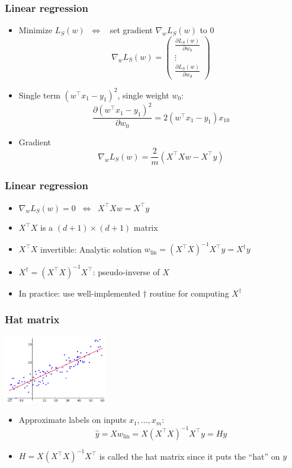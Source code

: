 \documentclass[10pt]{beamer}
\begin{document}
\begin{frame}
  \frametitle{Linear regression}
  \begin{itemize}
	\item Minimize $L_S(w) \;\; \Leftrightarrow \;\;$ set {\color{red} gradient} $\nabla_w L_S(w)$ to $0$
	\[
	\nabla_w L_S(w) = \left( \begin{array}{c} \frac {\partial L_S(w)} {\partial w_0} \\ \vdots \\ \frac {\partial L_S(w)} {\partial w_d} \end{array} \right)
	\]
	\pause
	\item Single term $(w^\top x_1 - y_1)^2$, single weight $w_0$:
  \[
	\frac {\partial (w^\top x_1 - y_1)^2} {\partial w_0} = 2(w^\top x_1 - y_1) x_{10}
  \]
	\pause
	\item {\color{red} Gradient}
	\[\nabla_w L_S(w)=\frac{2}{m}(X^\top X w - X^\top y)\]
  \end{itemize}
\end{frame}

\begin{frame}
  \frametitle{Linear regression}
  \begin{itemize}
	\item $\nabla_w L_S(w) = 0 \;\; \Leftrightarrow \;\; X^\top X w = X^\top y$
	\item $X^\top X$ is a $(d+1)\times(d+1)$ matrix
	\pause
	\vspace*{0.5cm}
	\item $X^\top X$ invertible: {\color{blue} Analytic solution} $w_{\mathrm{lin}} = (X^\top X)^{-1}X^\top y = X^\dagger y$
	\item $X^\dagger = (X^\top X)^{-1}X^\top$: {\color{green} pseudo-inverse} of $X$
	\item {\color{cyan} In practice}: use well-implemented $\dagger$ routine for computing $X^\dagger$
  \end{itemize}
\end{frame}

\begin{frame}
  \frametitle{Hat matrix}
  \begin{center}
  \includegraphics[height=3cm]{images/linreg.png}
  \end{center}
  \begin{itemize}
	\item Approximate labels on inputs $x_1,\ldots,x_m$:
	\[
	\hat{y} = X w_{\mathrm{lin}} = X(X^\top X)^{-1}X^\top y = H y
	\]
	\item $H=X(X^\top X)^{-1}X^\top$ is called the {\color{red} hat matrix} since it puts the ``hat'' on $y$
  \end{itemize}
\end{frame}
\end{document}
